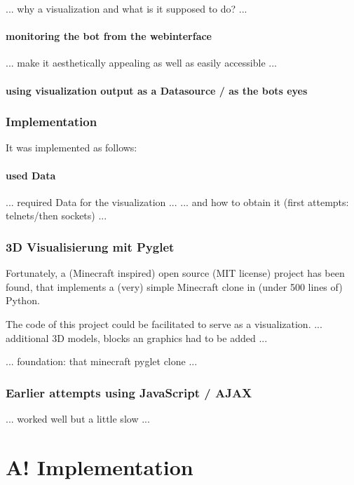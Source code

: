 
... why a visualization and what is it supposed to do? ...

\paragraph{monitoring the bot from the webinterface}
... make it aesthetically appealing as well as easily accessible ...

\paragraph{using visualization output as a Datasource / as the bots eyes}

\subsubsection{Implementation}

It was implemented as follows:



\paragraph{used Data}
... required Data for the visualization ...
... and how to obtain it (first attempts: telnets/then sockets) ...

\subsubsection{3D Visualisierung mit Pyglet}
Fortunately, a (Minecraft inspired) open source (MIT license) project has been found, that implements a (very) simple Minecraft clone in (under 500 lines of) Python.\cite{github_minecraftpython}

The code of this project could be facilitated to serve as a visualization.
... additional 3D models, blocks an graphics had to be added ...

... foundation: that minecraft pyglet clone ...

\subsubsection{Earlier attempts using JavaScript / AJAX}
... worked well but a little slow ...

\section{A! Implementation}

